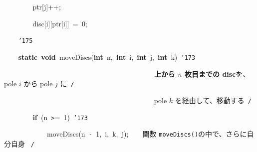 \documentclass[a4paper,10pt]{article}
\def\mc{\relax}
\begin{document}
\noindent
\mbox{}{\tt\mc \ }{\tt\mc \ }{\tt\mc \ }{\tt\mc \ }{\tt\mc \ }{\tt\mc \ }{\tt\mc \ }{\tt\mc \ }ptr[j]++;

\noindent
\mbox{}{\tt\mc \ }{\tt\mc \ }{\tt\mc \ }{\tt\mc \ }{\tt\mc \ }{\tt\mc \ }{\tt\mc \ }{\tt\mc \ }disc[i][ptr[i]]{\tt\mc \ }={\tt\mc \ }0;

\noindent
\mbox{}{\tt\mc \ }{\tt\mc \ }{\tt\mc \ }{\tt\mc \ }{\tt\char'175}

\noindent
\mbox{}\hfill

\noindent
\mbox{}{\tt\mc \ }{\tt\mc \ }{\tt\mc \ }{\tt\mc \ }\textbf{static}{\tt\mc \ }\textbf{void}{\tt\mc \ }moveDiscs(\textbf{int}{\tt\mc \ }n,{\tt\mc \ }\textbf{int}{\tt\mc \ }i,{\tt\mc \ }\textbf{int}{\tt\mc \ }j,{\tt\mc \ }\textbf{int}{\tt\mc \ }k){\tt\mc \ }{\tt\char'173}

\noindent
\mbox{}{\tt\mc \ }{\tt\mc \ }{\tt\mc \ }{\tt\mc \ }{\tt\mc \ }{\tt\mc \ }{\tt\mc \ }{\tt\mc \ }{\tt\mc \ }{\tt\mc \ }{\tt\mc \ }{\tt\mc \ }{\tt\mc \ }{\tt\mc \ }{\tt\mc \ }{\tt\mc \ }{\tt\mc \ }{\tt\mc \ }{\tt\mc \ }{\tt\mc \ }{\tt\mc \ }{\tt\mc \ }{\tt\mc \ }{\tt\mc \ }{\tt\mc \ }{\tt\mc \ }{\tt\mc \ }{\tt\mc \ }{\tt\mc \ }{\tt\mc \ }{\tt\mc \ }{\tt\mc \ }{\tt\mc \ }{\tt\mc \ }{\tt\mc \ }{\tt\mc \ }{\tt\mc \ }{\tt\mc \ }{\tt\mc \ }{\tt\mc \ }\rm\mc {\tt /}{\tt *}\  \ \textbf{\textsf{上から $n$ 枚目までの disc}}を、pole $i$ から pole $j$ に\hfill \rm\mc \ {\tt *}{\tt /}
\tt\mc 

\noindent
\mbox{}{\tt\mc \ }{\tt\mc \ }{\tt\mc \ }{\tt\mc \ }{\tt\mc \ }{\tt\mc \ }{\tt\mc \ }{\tt\mc \ }{\tt\mc \ }{\tt\mc \ }{\tt\mc \ }{\tt\mc \ }{\tt\mc \ }{\tt\mc \ }{\tt\mc \ }{\tt\mc \ }{\tt\mc \ }{\tt\mc \ }{\tt\mc \ }{\tt\mc \ }{\tt\mc \ }{\tt\mc \ }{\tt\mc \ }{\tt\mc \ }{\tt\mc \ }{\tt\mc \ }{\tt\mc \ }{\tt\mc \ }{\tt\mc \ }{\tt\mc \ }{\tt\mc \ }{\tt\mc \ }{\tt\mc \ }{\tt\mc \ }{\tt\mc \ }{\tt\mc \ }{\tt\mc \ }{\tt\mc \ }{\tt\mc \ }{\tt\mc \ }\rm\mc {\tt /}{\tt *}\  \ pole $k$ を経由して、移動する\hfill \rm\mc \ {\tt *}{\tt /}
\tt\mc 

\noindent
\mbox{}{\tt\mc \ }{\tt\mc \ }{\tt\mc \ }{\tt\mc \ }{\tt\mc \ }{\tt\mc \ }{\tt\mc \ }{\tt\mc \ }\textbf{if}{\tt\mc \ }(n{\tt\mc \ }{\tt >}={\tt\mc \ }1){\tt\mc \ }{\tt\char'173}

\noindent
\mbox{}{\tt\mc \ }{\tt\mc \ }{\tt\mc \ }{\tt\mc \ }{\tt\mc \ }{\tt\mc \ }{\tt\mc \ }{\tt\mc \ }{\tt\mc \ }{\tt\mc \ }{\tt\mc \ }{\tt\mc \ }moveDiscs(n{\tt\mc \ }{\tt -}{\tt\mc \ }1,{\tt\mc \ }i,{\tt\mc \ }k,{\tt\mc \ }j);{\tt\mc \ }{\tt\mc \ }\rm\mc {\tt /}{\tt *}\  \ 関数 {\tt moveDiscs()}の中で、さらに自分自身 \hfill \rm\mc \ {\tt *}{\tt /}
\tt\mc 
\end{document}
